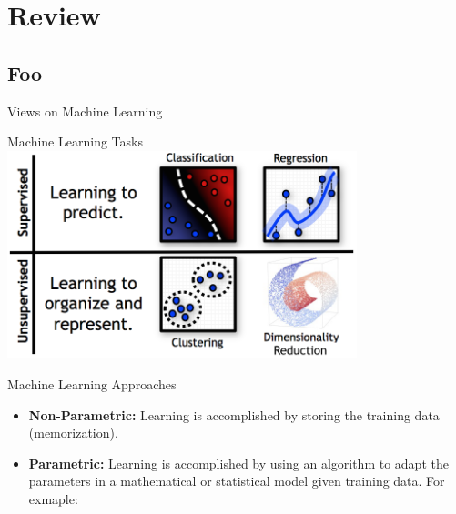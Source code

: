 \documentclass[serif,xcolor=pdftex,dvipsnames,table,hyperref={bookmarks=false}]{beamer}
\begin{document}
\maketitlepage

\section{Review}
\subsection{Foo}


\begin{frame}[t]{Views on Machine Learning}


\end{frame}

\begin{frame}[t]{Machine Learning Tasks}
 \centering
 \includegraphics[width=4in]{../Figures/learning_problems.png}
\end{frame}

\begin{frame}[t]{Machine Learning Approaches}
  \begin{itemize}
    \item \textbf{Non-Parametric:} Learning is accomplished by storing the training data (memorization).
    
    \item \textbf{Parametric:} Learning is accomplished by using an algorithm to adapt the parameters in a mathematical or statistical model given training data. For exmaple:\\
    
    
  \end{itemize}
\end{frame}
\end{document}

